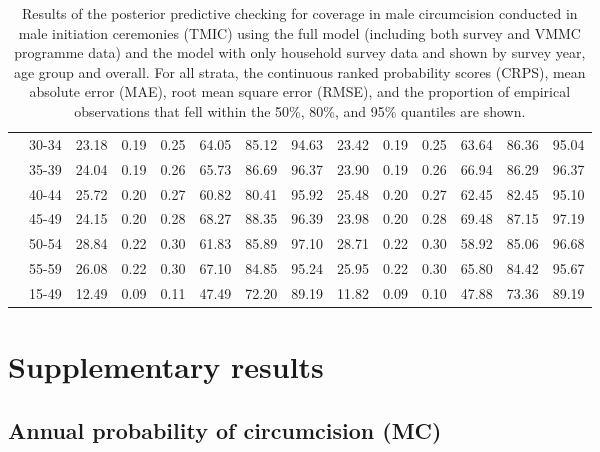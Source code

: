 \documentclass{article}
\begin{document}
\begin{appendix}
\begin{landscape}
{\begin{table}[H]
\begin{tabular}{ll ccc ccc ccc ccc}
    & 30-34 &  23.18 & 0.19 & 0.25 & 64.05 & 85.12 & 94.63 &  23.42 & 0.19 & 0.25 & 63.64 & 86.36 &  95.04 \\ 
    & 35-39 &  24.04 & 0.19 & 0.26 & 65.73 & 86.69 & 96.37 &  23.90 & 0.19 & 0.26 & 66.94 & 86.29 &  96.37 \\ 
    & 40-44 &  25.72 & 0.20 & 0.27 & 60.82 & 80.41 & 95.92 &  25.48 & 0.20 & 0.27 & 62.45 & 82.45 &  95.10 \\ 
    & 45-49 &  24.15 & 0.20 & 0.28 & 68.27 & 88.35 & 96.39 &  23.98 & 0.20 & 0.28 & 69.48 & 87.15 &  97.19 \\ 
    & 50-54 &  28.84 & 0.22 & 0.30 & 61.83 & 85.89 & 97.10 &  28.71 & 0.22 & 0.30 & 58.92 & 85.06 &  96.68 \\ 
    & 55-59 &  26.08 & 0.22 & 0.30 & 67.10 & 84.85 & 95.24 &  25.95 & 0.22 & 0.30 & 65.80 & 84.42 &  95.67 \\ 
    & 15-49 &  12.49 & 0.09 & 0.11 & 47.49 & 72.20 & 89.19 &  11.82 & 0.09 & 0.10 & 47.88 & 73.36 &  89.19 \\[5pt]
    \hline
    \end{tabular}
    \caption{Results of the posterior predictive checking for coverage in male circumcision conducted in male initiation ceremonies (TMIC) using the full model (including both survey and VMMC programme data) and the model with only household survey data and shown by survey year, age group and overall. For all strata, the continuous ranked probability scores (CRPS), mean absolute error (MAE), root mean square error (RMSE), and the proportion of empirical observations that fell within the 50\%, 80\%, and 95\% quantiles are shown.}
\end{table}}

\end{landscape}


\section{Supplementary results}


\subsection{Annual probability of circumcision (MC)}


\end{appendix}
\end{document}
